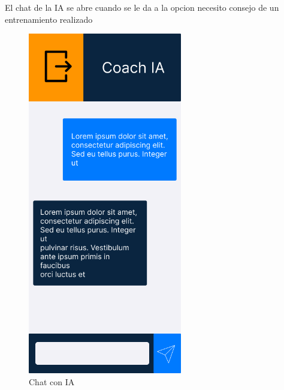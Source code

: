\newpage

El chat de la IA se abre cuando se le da a la opcion necesito consejo de un entrenamiento realizado
\begin{figure}[H]
   \centering
    \includegraphics[width=0.6\textwidth]{fotos/Frame 32.png}
    \caption{Chat con IA}
    \label{fig:Chat con IA}
\end{figure}

\newpage

